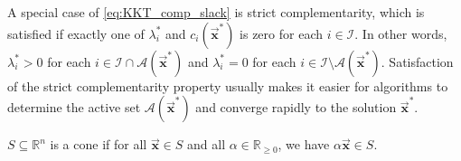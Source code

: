 \documentclass[9pt, headings=standardclasses, parskip=half]{scrartcl}
\renewcommand{\emph}[1]{\textcolor{mypurple}{#1}}
\newcommand{\vect}[1]{\vec{\boldsymbol{#1}}}
\newcommand{\R}{\mathbb{R}}
\begin{document}

A special case of \eqref{eq:KKT_comp_slack} is \emph{strict complementarity}, which is satisfied if exactly one of \(\lambda_{i}^{\ast}\) and \(c_{i}(\vect{x}^{\ast})\) is zero for each \(i\in\mathcal{I}\).
In other words, \(\lambda_{i}^{\ast} > 0\) for each \(i\in\mathcal{I} \cap \mathcal{A}(\vect{x}^{\ast})\) and \(\lambda_{i}^{\ast} = 0\) for each \(i\in\mathcal{I} \setminus \mathcal{A}(\vect{x}^{\ast})\).
Satisfaction of the strict complementarity property usually makes it easier for algorithms to determine the active set \(\mathcal{A}(\vect{x}^{\ast})\) and converge rapidly to the solution \(\vect{x}^{\ast}\).

\begin{definition}[Cone]\label{def:cone}
  \(S\subseteq\R^{n}\) is a \emph{cone} if for all \(\vect{x}\in S\) and all \(\alpha \in \R_{\ge 0}\), we have \(\alpha \vect{x} \in S\).
\end{definition}
\end{document}
